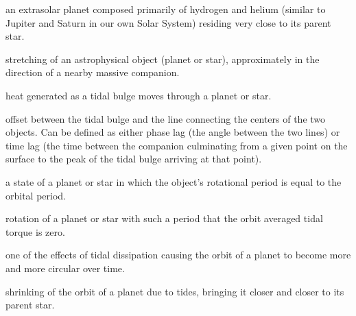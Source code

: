 \begin{glossary}[Glossary]

     an extrasolar planet composed primarily of hydrogen and
    helium (similar to Jupiter and Saturn in our own Solar System) residing very
    close to its parent star.

     stretching of an astrophysical object (planet or star),
    approximately in the direction of a nearby massive companion.

     heat generated as a tidal bulge moves through a
    planet or star.

     offset between the tidal bulge and the line connecting the
    centers of the two objects. Can be defined as either phase lag (the angle
    between the two lines) or time lag (the time between the companion
        culminating from a given point on the surface to the peak of the tidal
    bulge arriving at that point).

     a state of a planet or star in which the
    object's rotational period is equal to the orbital period.

     rotation of a planet or star with such a
    period that the orbit averaged tidal torque is zero.

     one of the effects of tidal dissipation
    causing the orbit of a planet to become more and more circular over time.

     shrinking of the orbit of a planet due to tides,
    bringing it closer and closer to its parent star.

\end{glossary}
